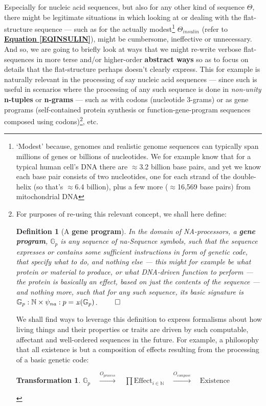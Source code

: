 \documentclass[a4paper, 18pt]{book} %
\newtheorem{defn}{Definition}
\newtheorem{trans}{Transformation}
\newcommand{\invpi}{\rotatebox[origin=c]{180}{$\pi$}}
\begin{document}
Especially for nucleic acid sequences, but also for any other kind of sequence $\Theta$, there might be legitimate situations in which looking at or dealing with the flat-structure sequence --- such as for the actually modest\footnote{`Modest' because, genomes and realistic genome sequences can typically span millions of genes or billions of nucleotides. We for example know that for a typical human cell's DNA there are $\approx$3.2 billion base pairs\cite{Venter2001}, and yet we know each base pair consists of two nucleotides, one for each strand of the double-helix (so that's $\approx$6.4 billion), plus a few more ($\approx$16,569 base pairs) from mitochondrial DNA\cite{Anderson1981}} $\Theta_{insulin}$ (refer to \textbf{\hyperref[EQINSULIN]{Equation \ref{EQINSULIN}}}), might be cumbersome, ineffective or unnecessary. And so, we are going to briefly look at ways that we might re-write verbose flat-sequences in more terse and/or higher-order \textbf{abstract ways} so as to focus on details that the flat-structure perhaps doesn't clearly express. This for example is naturally relevant in the processing of say nucleic acid sequences --- since such is useful in scenarios where the processing of any such sequence is done in \textit{non-unity} \textbf{n-tuples} or \textbf{n-grams} --- such as with codons (nucleotide 3-grams) or as gene programs (self-contained protein synthesis or function-gene-program sequences composed using codons)\footnote{
For purposes of re-using this relevant concept, we shall here define: 

\begin{defn}[A \textbf{gene program}]
\label{DEFGENPROG}
 In the domain of NA-processors, a \textbf{gene program}, $\mathbb{G}_{p}$ is any sequence of na-Sequence symbols, such that the sequence expresses or contains some sufficient instructions in form of genetic code, that specify what to do, and nothing else --- this might for example be what protein or material to produce, or what DNA-driven function to perform --- the protein is basically an effect, based on just the contents of the sequence --- and nothing more, such that for any such sequence, its basic signature is $\mathbb{G}_{p}: \mathbb{N} \times \psi_{na}:p=\invpi(\mathbb{G}_{p})$.
$\qed$
\end{defn} We shall find ways to leverage this definition to express formalisms about how living things and their properties or traits are driven by such computable, affectant and well-ordered sequences in the future. For example, a philosophy that all existence is but a composition of effects resulting from the processing of a basic genetic code:

\begin{trans}
\label{TRANSTOENASEQ}
$\mathbb{G}_{p}  \quad \xrightarrow{O_{process}} \quad \prod \text{Effect}_{i \in \mathbb{N}}  \quad \xrightarrow{O_{compose}}  \quad \text{Existence}$
\end{trans}

}, etc.
\end{document}
